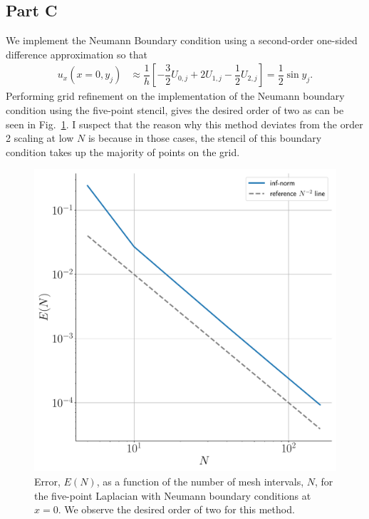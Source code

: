 \documentclass[12pt]{article}
\begin{document}
\subsection*{Part C}

We implement the Neumann Boundary condition using a second-order one-sided difference approximation so that
\begin{align}
	u_{x}(x=0,y_{j}) &\approx \dfrac{1}{h}\left[-\dfrac{3}{2}U_{0,j}+2U_{1,j}-\dfrac{1}{2}U_{2,j}\right] = \dfrac{1}{2}\sin y_{j}.
\end{align}
Performing grid refinement on the implementation of the Neumann boundary condition using the five-point stencil, gives the desired order of two as can be seen in Fig.~\ref{fig:neumann_err_scaling}. I suspect that the reason why this method deviates from the order 2 scaling at low $N$ is because in those cases, the stencil of this boundary condition takes up the majority of points on the grid. 

\begin{figure}[!h]
	\centering
	\includegraphics[clip,scale=0.4]{q2c_err_fig.pdf}
	\caption{Error, $E(N)$, as a function of the number of mesh intervals, $N$, for the five-point Laplacian with Neumann boundary conditions at $x=0$. We observe the desired order of two for this method.}
	\label{fig:neumann_err_scaling}
\end{figure}
\end{document}
